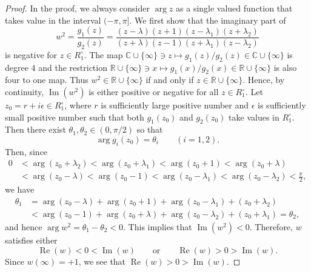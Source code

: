 \documentclass[11pt]{amsart}
\renewcommand{\Re}{\operatorname{Re}}
\renewcommand{\Im}{\operatorname{Im}}
\numberwithin{equation}{section}
\numberwithin{figure}{section}
\theoremstyle{plain} %
\theoremstyle{definition} %
\begin{document}
\begin{proof}
In the proof, we always consider $\arg z$ as a single valued function that takes value 
in the interval $(-\pi,\pi]$. 
We first show that the imaginary part of 
\[
w^2=\frac{g_1(z)}{g_2(z)}
   =\frac{(z-\lambda)(z+1)(z-\lambda_1)(z+\lambda_2)}{(z+\lambda)(z-1)(z+\lambda_1)(z-\lambda_2)}
\]
is negative for $z\in R_1^\circ$. 
The map $\mathbb{C}\cup\{\infty\}\ni z\mapsto g_1(z)/g_2(z)\in\mathbb{C}\cup\{\infty\}$ is degree 4 
and the restriction $\mathbb{R}\cup\{\infty\}\ni x\mapsto g_1(x)/g_2(x)\in\mathbb{R}\cup\{\infty\}$ 
is also four to one map. 
Thus $w^2\in\mathbb{R}\cup\{\infty\}$ if and only if $z\in\mathbb{R}\cup\{\infty\}$. 
Hence, by continuity, $\Im(w^2)$ is either positive or negative for all $z\in R_1^\circ$. 
Let $z_0=r+i\epsilon\in R_1^\circ$, where $r$ is sufficiently large positive number and 
$\epsilon$ is sufficiently small positive number such that both $g_1(z_0)$ and $g_2(z_0)$ take 
values in $R_1^\circ$. 
Then there exist $\theta_1,\theta_2\in (0,\pi/2)$ so that 
\[
\arg g_i(z_0) = \theta_i\qquad (i=1,2). 
\]
Then, since 
\begin{align*}
0&<\arg (z_0+\lambda_2)
  <\arg (z_0+\lambda_1)
  <\arg (z_0+1)
  <\arg (z_0+\lambda) \\
 &<\arg (z_0-\lambda)
  <\arg (z_0-1)
  <\arg (z_0-\lambda_1)
  <\arg (z_0-\lambda_2)
  <\frac{\pi}{2}, 
\end{align*}
we have 
\begin{align*}
\theta_1
&=\arg (z_0-\lambda)+\arg (z_0+1)+\arg (z_0-\lambda_1)+(z_0+\lambda_2) \\
&<\arg (z_0-1)+\arg (z_0+\lambda)+\arg (z_0-\lambda_2)+(z_0+\lambda_1)
 =\theta_2,  
\end{align*}
and hence $\arg w^2=\theta_1-\theta_2<0$. 
This implies that $\Im(w^2)<0$. 
Therefore, $w$ satisfies either
\[
\Re(w)<0<\Im(w)
\qquad\mbox{or}\qquad
\Re(w)>0>\Im(w). 
\]
Since $w(\infty)=+1$, we see that $\Re(w)>0>\Im(w)$. 
\end{proof}
 
\end{document}
